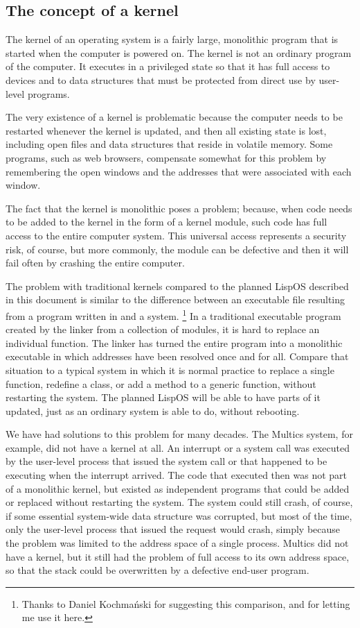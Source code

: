 \subsection{The concept of a kernel}

The kernel of an operating system is a fairly large, monolithic
program that is started when the computer is powered on. The kernel is
not an ordinary program of the computer. It executes in a privileged
state so that it has full access to devices and to data structures
that must be protected from direct use by user-level programs.

The very existence of a kernel is problematic because the computer
needs to be restarted whenever the kernel is updated, and then all
existing state is lost, including open files and data structures that
reside in volatile memory. Some programs, such as web browsers,
compensate somewhat for this problem by remembering the open windows
and the addresses that were associated with each window.

The fact that the kernel is monolithic poses a problem; because, when
code needs to be added to the kernel in the form of a kernel module,
such code has full access to the entire computer system. This
universal access represents a security risk, of course, but more
commonly, the module can be defective and then it will fail often by
crashing the entire computer.

The problem with traditional kernels compared to the planned LispOS
described in this document is similar to the difference between an
executable file resulting from a program written in \clanguage{} and a
\commonlisp{} system.%
\footnote{Thanks to Daniel Kochmański for suggesting this comparison,
  and for letting me use it here.}  In a traditional executable
program created by the linker from a collection of modules, it is hard
to replace an individual function.  The linker has turned the entire
program into a monolithic executable in which addresses have been
resolved once and for all.  Compare that situation to a typical
\commonlisp{} system in which it is normal practice to replace a
single function, redefine a class, or add a method to a generic
function, without restarting the \commonlisp{} system.  The planned
LispOS will be able to have parts of it updated, just as an ordinary
\commonlisp{} system is able to do, without rebooting.

We have had solutions to this problem for many decades. The Multics
system, for example, did not have a kernel at all. An interrupt or a
system call was executed by the user-level process that issued the
system call or that happened to be executing when the interrupt
arrived. The code that executed then was not part of a monolithic
kernel, but existed as independent programs that could be added or
replaced without restarting the system. The system could still crash,
of course, if some essential system-wide data structure was corrupted,
but most of the time, only the user-level process that issued the
request would crash, simply because the problem was limited to the
address space of a single process.  Multics did not have a kernel, but
it still had the problem of full access to its own address space, so
that the stack could be overwritten by a defective end-user program.

